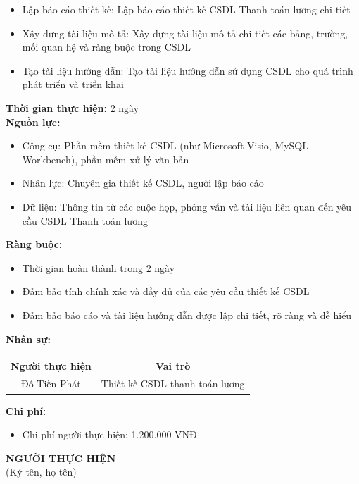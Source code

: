 {\begin{minipage}{\textwidth}
\begin{itemize}
        \item Lập báo cáo thiết kế: Lập báo cáo thiết kế CSDL Thanh toán lương chi tiết
        \item Xây dựng tài liệu mô tả: Xây dựng tài liệu mô tả chi tiết các bảng, trường, mối quan hệ và ràng buộc trong CSDL
        \item Tạo tài liệu hướng dẫn: Tạo tài liệu hướng dẫn sử dụng CSDL cho quá trình phát triển và triển khai
    \end{itemize}
    \vspace{0.5cm}
    \noindent \textbf{Thời gian thực hiện:} 2 ngày \\
    \noindent \textbf{Nguồn lực:}
    \begin{itemize}
        \item Công cụ: Phần mềm thiết kế CSDL (như Microsoft Visio, MySQL Workbench), phần mềm xử lý văn bản
        \item Nhân lực: Chuyên gia thiết kế CSDL, người lập báo cáo
        \item Dữ liệu: Thông tin từ các cuộc họp, phỏng vấn và tài liệu liên quan đến yêu cầu CSDL Thanh toán lương
    \end{itemize}
    \vspace{0.5cm}
    \noindent \textbf{Ràng buộc:}
    \begin{itemize}
        \item Thời gian hoàn thành trong 2 ngày
        \item Đảm bảo tính chính xác và đầy đủ của các yêu cầu thiết kế CSDL
        \item Đảm bảo báo cáo và tài liệu hướng dẫn được lập chi tiết, rõ ràng và dễ hiểu
    \end{itemize}
    \vspace{0.5cm}
    \noindent \textbf{Nhân sự:}
    \begin{longtable}{|c|c|}
    \hline
    \textbf{Người thực hiện} & \textbf{Vai trò} \\
    \hline
    Đỗ Tiến Phát & Thiết kế CSDL thanh toán lương \\
    \hline
    \end{longtable}
    \vspace{0.5cm}
    \noindent \textbf{Chi phí:}
    \begin{itemize}
        \item Chi phí người thực hiện: 1.200.000 VNĐ
    \end{itemize}
    \vspace{1cm}
    \begin{flushleft}
        \hspace{8cm} \textbf{NGƯỜI THỰC HIỆN} \\
        \hspace{8.8cm} (Ký tên, họ tên) \\
        \vspace{1cm}
    \end{flushleft}
    \end{minipage}
}
% 
